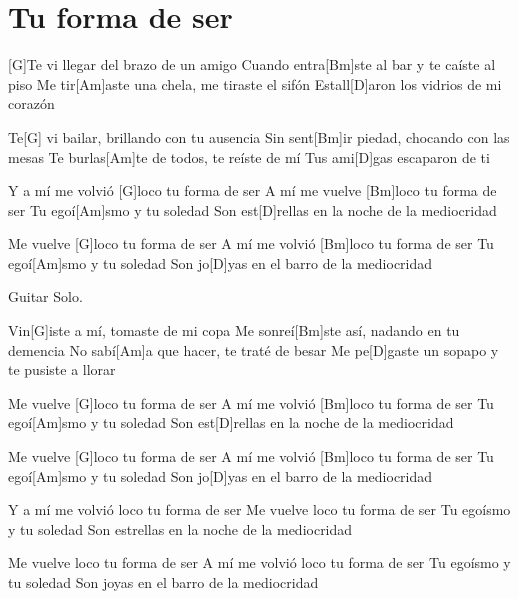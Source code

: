 \section{Tu forma de ser}

\noindent
\chordG
\chordBm
\chordAm
\chordD 

\vspace{1cm}

\begin{guitar}


\begin{multicols}{2}

	[G]Te vi llegar del brazo de un amigo
	Cuando entra[Bm]ste al bar y te caíste al piso
	Me tir[Am]aste una chela, me tiraste el sifón
	Estall[D]aron los vidrios de mi corazón

	Te[G] vi bailar, brillando con tu ausencia
	Sin sent[Bm]ir piedad, chocando con las mesas
	Te burlas[Am]te de todos, te reíste de mí
	Tus ami[D]gas escaparon de ti


	\vspace{0.3cm}

	Y a mí me volvió [G]loco tu forma de ser
	A mí me vuelve [Bm]loco tu forma de ser
	Tu egoí[Am]smo y tu soledad
	Son est[D]rellas en la noche de la mediocridad

	Me vuelve [G]loco tu forma de ser
	A mí me volvió [Bm]loco tu forma de ser
	Tu egoí[Am]smo y tu soledad
	Son jo[D]yas en el barro de la mediocridad


	\vspace{0.3cm}

	Guitar Solo.


	\vspace{0.3cm}

	Vin[G]iste a mí, tomaste de mi copa
	Me sonreí[Bm]ste así, nadando en tu demencia
	No sabí[Am]a que hacer, te traté de besar
	Me pe[D]gaste un sopapo y te pusiste a llorar

	\vspace{0.3cm}

	Me vuelve [G]loco tu forma de ser
	A mí me volvió [Bm]loco tu forma de ser
	Tu egoí[Am]smo y tu soledad
	Son est[D]rellas en la noche de la mediocridad

	Me vuelve [G]loco tu forma de ser
	A mí me volvió [Bm]loco tu forma de ser
	Tu egoí[Am]smo y tu soledad
	Son jo[D]yas en el barro de la mediocridad

	\vspace{0.3cm}

	Y a mí me volvió loco tu forma de ser
	Me vuelve loco tu forma de ser
	Tu egoísmo y tu soledad
	Son estrellas en la noche de la mediocridad

	Me vuelve loco tu forma de ser
	A mí me volvió loco tu forma de ser
	Tu egoísmo y tu soledad
	Son joyas en el barro de la mediocridad

\end{multicols}

\end{guitar}
